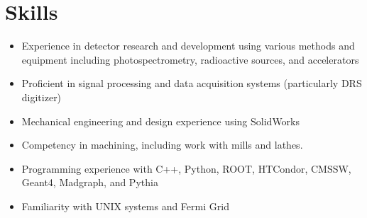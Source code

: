 \documentclass[11pt,a4paper,sans,english]{moderncv}        %
\begin{document}

\section{Skills}
\begin{itemize}
\item Experience in detector research and development using various methods and equipment including photospectrometry, radioactive sources, and accelerators
\item Proficient in signal processing and data acquisition systems (particularly DRS digitizer)
\item Mechanical engineering and design experience using SolidWorks
\item Competency in machining, including work with mills and lathes.
\item Programming experience with C++, Python, ROOT, HTCondor, CMSSW, Geant4, Madgraph, and Pythia
\item Familiarity with UNIX systems and Fermi Grid
\end{itemize}
\end{document}
